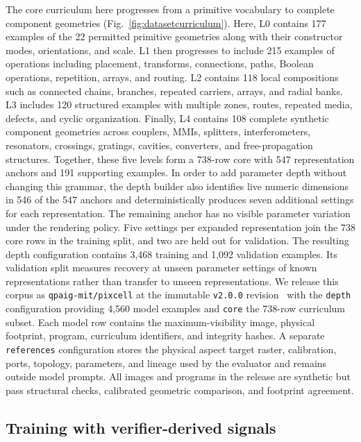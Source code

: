 \documentclass[%
 reprint,
 superscriptaddress,
 amsmath,amssymb,
 aps,
 pra,
 longbibliography,
 floatfix,
]{revtex4-2}
\begin{document}
The core curriculum here progresses from a primitive vocabulary to complete
component geometries (Fig.~\ref{fig:datasetcurriculum}). Here, L0 contains 177
examples of the 22 permitted primitive geometries along with their constructor
modes, orientations, and scale. L1 then progresses to include 215 examples of
operations including placement, transforms, connections, paths, Boolean
operations, repetition, arrays, and routing. L2 contains 118 local compositions
such as connected chains, branches, repeated carriers, arrays, and radial
banks. L3 includes 120 structured examples with multiple zones, routes,
repeated media, defects, and cyclic organization. Finally, L4 contains 108
complete synthetic component geometries across couplers, MMIs, splitters,
interferometers, resonators, crossings, gratings, cavities, converters, and
free-propagation structures. Together, these five levels form a 738-row core
with 547 representation anchors and 191 supporting examples. In order to add
parameter depth without changing this grammar, the depth builder also
identifies live numeric dimensions in 546 of the 547 anchors and
deterministically produces seven additional settings for each representation.
The remaining anchor has no visible parameter variation under the rendering
policy. Five settings per expanded representation join the 738 core rows in
the training split, and two are held out for validation. The resulting depth
configuration contains 3{,}468 training and 1{,}092 validation examples. Its
validation split measures recovery at unseen parameter settings of known
representations rather than transfer to unseen representations. We release
this corpus as \texttt{qpaig-mit/pixcell} at the immutable \texttt{v2.0.0}
revision~\cite{pixcelldataset} with the \texttt{depth} configuration providing
4{,}560 model examples and \texttt{core} the 738-row curriculum subset. Each
model row contains the maximum-visibility image, physical footprint, program,
curriculum identifiers, and integrity hashes. A separate \texttt{references}
configuration stores the physical aspect target raster, calibration, ports,
topology, parameters, and lineage used by the evaluator and remains outside
model prompts. All images and programs in the release are synthetic but pass
structural checks, calibrated geometric comparison, and footprint agreement.

\subsection{Training with verifier-derived signals}
\end{document}

